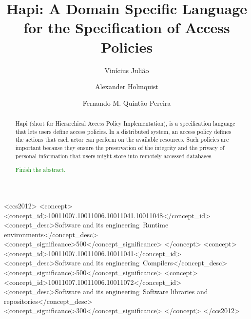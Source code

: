 \documentclass[sigplan,screen,anonymous,review]{acmart}\settopmatter{printfolios=true,printccs=false,printacmref=false}
\newcommand{\fer}[1]{\textcolor{green}{#1}}
\begin{document}
\title[Hapi: A Domain Specific Language for the Specification of Access Policies]
{Hapi: A Domain Specific Language for the Specification of Access Policies}

\author{Vin\'{i}cius Juli\~{a}o}

\author{Alexander Holmquist}

\author{Fernando M. Quint\~{a}o Pereira}


\begin{abstract}
Hapi (short for Hierarchical Access Policy Implementation), is a specification
language that lets users define access policies.
In a distributed system, an access policy defines the actions that each actor
can perform on the available resources. 
Such policies are important because they ensure the preservation of the
integrity and the privacy of personal information that users might store
into remotely accessed databases.

\fer{Finish the abstract.}
\end{abstract}

\begin{CCSXML}
 <ccs2012>
 <concept>
 <concept_id>10011007.10011006.10011041.10011048</concept_id>
 <concept_desc>Software and its engineering~Runtime environments</concept_desc>
 <concept_significance>500</concept_significance>
 </concept>
 <concept>
 <concept_id>10011007.10011006.10011041</concept_id>
 <concept_desc>Software and its engineering~Compilers</concept_desc>
 <concept_significance>500</concept_significance>
 <concept>
 <concept_id>10011007.10011006.10011072</concept_id>
 <concept_desc>Software and its engineering~Software libraries and repositories</concept_desc>
 <concept_significance>300</concept_significance>
 </concept>
 </ccs2012>
\end{CCSXML}
\end{document}
